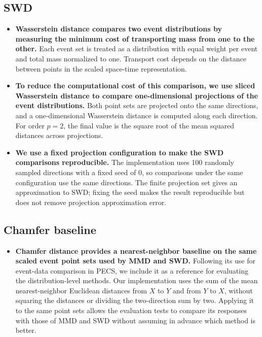 \subsection{SWD}

\begin{itemize}

  \item \textbf{Wasserstein distance compares two event distributions by measuring the minimum cost of transporting mass from one to the other.} Each event set is treated as a distribution with equal weight per event and total mass normalized to one. Transport cost depends on the distance between points in the scaled space-time representation.

  \item \textbf{To reduce the computational cost of this comparison, we use sliced Wasserstein distance to compare one-dimensional projections of the event distributions.} Both point sets are projected onto the same directions, and a one-dimensional Wasserstein distance is computed along each direction. For order \(p=2\), the final value is the square root of the mean squared distances across projections.

  \item \textbf{We use a fixed projection configuration to make the SWD comparisons reproducible.} The implementation uses 100 randomly sampled directions with a fixed seed of 0, so comparisons under the same configuration use the same directions. The finite projection set gives an approximation to SWD; fixing the seed makes the result reproducible but does not remove projection approximation error.
\end{itemize}

\subsection{Chamfer baseline}

\begin{itemize}
  \item \textbf{Chamfer distance provides a nearest-neighbor baseline on the same scaled event point sets used by MMD and SWD.} Following its use for event-data comparison in PECS, we include it as a reference for evaluating the distribution-level methods. \cite{han2024pecs} Our implementation uses the sum of the mean nearest-neighbor Euclidean distances from $X$ to $Y$ and from $Y$ to $X$, without squaring the distances or dividing the two-direction sum by two. Applying it to the same point sets allows the evaluation tests to compare its responses with those of MMD and SWD without assuming in advance which method is better.
\end{itemize}

